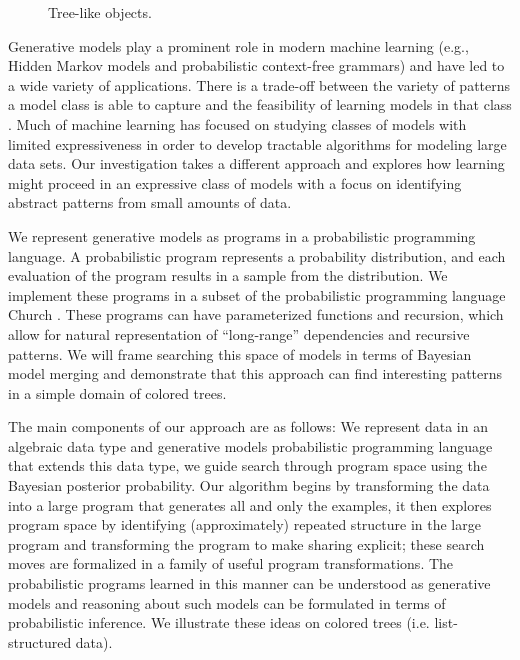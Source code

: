 \documentclass[a4paper,10pt]{article}
\begin{document}
\begin{figure}[b]
\begin{center}
\end{center}
\caption{Tree-like objects.}
\label{fig:plants}
\end{figure}



Generative models play a prominent role in modern machine learning (e.g., Hidden Markov models and probabilistic context-free grammars) and have led to a wide variety of applications.  There is a trade-off between the variety of patterns a model class is able to capture and the feasibility of learning models in that class \cite{Russell2003}.  Much of machine learning has focused on studying classes of models with limited expressiveness in order to develop tractable algorithms for modeling large data sets.  Our investigation takes a different approach and explores how learning might proceed in an expressive class of models with a focus on identifying abstract patterns from small amounts of data.

We represent generative models as programs in a probabilistic programming language. A probabilistic program represents a probability distribution, and each evaluation of the program results in a sample from the distribution. We implement these programs in a subset of the probabilistic programming language Church \cite{N.D.Goodman:2008:f2a0d}.  
These programs can have parameterized functions and recursion, which allow for natural representation of ``long-range'' dependencies and recursive patterns.  We will frame searching this space of models in terms of Bayesian model merging \cite{Stolcke:1994:IPG:645515.658235} and demonstrate that this approach can find interesting patterns in a simple domain of colored trees.

The main components of our approach are as follows: We represent data in an algebraic data type and generative models probabilistic programming language that extends this data type, we guide search through program space using the Bayesian posterior probability. Our algorithm begins by transforming the data into a large program that generates all and only the examples, it then explores program space by identifying (approximately) repeated structure in the large program and transforming the program to make sharing explicit; these search moves are formalized in a family of useful program transformations.
The probabilistic programs learned in this manner can be understood as generative models and reasoning about such models can be formulated in terms of probabilistic inference. We illustrate these ideas on colored trees (i.e. list-structured data).
\end{document}
